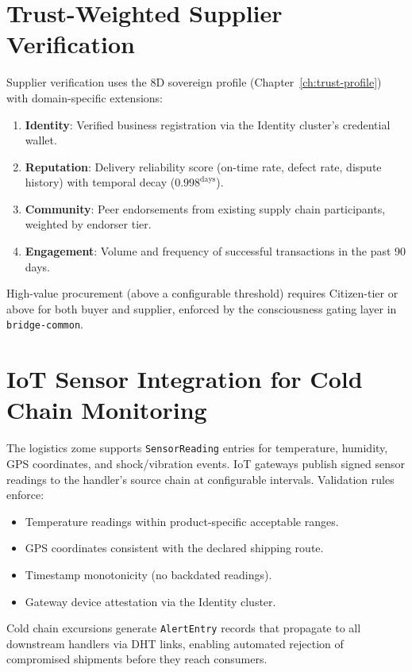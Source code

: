 \documentclass[12pt]{book}
\begin{document}
\section{Trust-Weighted Supplier Verification}

Supplier verification uses the 8D sovereign profile
(Chapter~\ref{ch:trust-profile}) with domain-specific extensions:

\begin{enumerate}
  \item \textbf{Identity}: Verified business registration via the
    Identity cluster's credential wallet.
  \item \textbf{Reputation}: Delivery reliability score (on-time rate,
    defect rate, dispute history) with temporal decay ($0.998^{\text{days}}$).
  \item \textbf{Community}: Peer endorsements from existing supply chain
    participants, weighted by endorser tier.
  \item \textbf{Engagement}: Volume and frequency of successful
    transactions in the past 90 days.
\end{enumerate}

High-value procurement (above a configurable threshold) requires
Citizen-tier or above for both buyer and supplier, enforced by the
consciousness gating layer in \texttt{bridge-common}.

\section{IoT Sensor Integration for Cold Chain Monitoring}

The logistics zome supports \texttt{SensorReading} entries for
temperature, humidity, GPS coordinates, and shock/vibration events.
IoT gateways publish signed sensor readings to the handler's source
chain at configurable intervals.  Validation rules enforce:

\begin{itemize}
  \item Temperature readings within product-specific acceptable ranges.
  \item GPS coordinates consistent with the declared shipping route.
  \item Timestamp monotonicity (no backdated readings).
  \item Gateway device attestation via the Identity cluster.
\end{itemize}

Cold chain excursions generate \texttt{AlertEntry} records that propagate
to all downstream handlers via DHT links, enabling automated rejection
of compromised shipments before they reach consumers.
\end{document}
